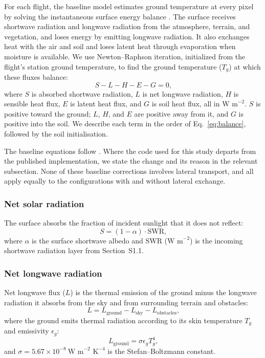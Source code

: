 \documentclass[12pt]{article}
\begin{document}
\noindent For each flight, the baseline model estimates ground temperature at every pixel by solving the instantaneous surface energy balance \citep{campbell_1998}. The surface receives shortwave radiation and longwave radiation from the atmosphere, terrain, and vegetation, and loses energy by emitting longwave radiation. It also exchanges heat with the air and soil and loses latent heat through evaporation when moisture is available. We use Newton--Raphson iteration, initialized from the flight's station ground temperature, to find the ground temperature ($T_g$) at which these fluxes balance:
\begin{equation} \label{eq:balance}
S - L - H - E - G = 0\textrm{,}
\end{equation}
\noindent where $S$ is absorbed shortwave radiation, $L$ is net longwave radiation, $H$ is sensible heat flux, $E$ is latent heat flux, and $G$ is soil heat flux, all in $\textrm{W m}^{-2}$. $S$ is positive toward the ground; $L$, $H$, and $E$ are positive away from it, and $G$ is positive into the soil. We describe each term in the order of Eq.~\ref{eq:balance}, followed by the soil initialisation.

The baseline equations follow \citet{Itzkovitch2025}. Where the code used for this study departs from the published implementation, we state the change and its reason in the relevant subsection. None of these baseline corrections involves lateral transport, and all apply equally to the configurations with and without lateral exchange.

\subsubsection{Net solar radiation}

\noindent The surface absorbs the fraction of incident sunlight that it does not reflect:
\begin{equation} \label{eq:S}
S = (1 - \alpha) \cdot \textrm{SWR}\textrm{,}
\end{equation}
\noindent where $\alpha$ is the surface shortwave albedo and $\textrm{SWR}$ ($\textrm{W m}^{-2}$) is the incoming shortwave radiation layer from Section~S1.1.

\subsubsection{Net longwave radiation}

\noindent Net longwave flux ($L$) is the thermal emission of the ground minus the longwave radiation it absorbs from the sky and from surrounding terrain and obstacles:
\begin{equation}
L = L_{\textrm{ground}} - L_{\textrm{sky}} - L_{\textrm{obstacles}}\textrm{,}
\end{equation}
\noindent where the ground emits thermal radiation according to its skin temperature $T_g$ and emissivity $\epsilon_g$:
\begin{equation}
L_{\textrm{ground}} = \sigma \epsilon_g T_g^4\textrm{,}
\end{equation}
\noindent and $\sigma = 5.67 \times 10^{-8}~\textrm{W m}^{-2}\textrm{ K}^{-4}$ is the Stefan--Boltzmann constant. 
\end{document}
